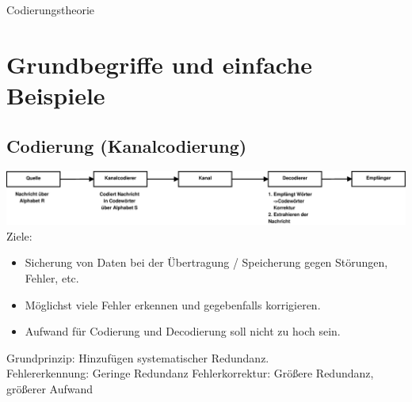 \newpage
\begin{center}
  \huge{Codierungstheorie}
\end{center}

\section{Grundbegriffe und einfache Beispiele}
  \subsection{Codierung (Kanalcodierung)}
    \includegraphics[width=\textwidth]{eps/pic02.eps}
    Ziele:
    \begin{itemize}
      \item Sicherung von Daten bei der Übertragung / Speicherung gegen
      Störungen, Fehler, etc.
      \item Möglichst viele Fehler erkennen und gegebenfalls korrigieren.
      \item Aufwand für Codierung und Decodierung soll nicht zu hoch sein.
    \end{itemize}
    Grundprinzip: Hinzufügen systematischer Redundanz.\\
    Fehlererkennung: Geringe Redundanz
    Fehlerkorrektur: Größere Redundanz, größerer Aufwand
